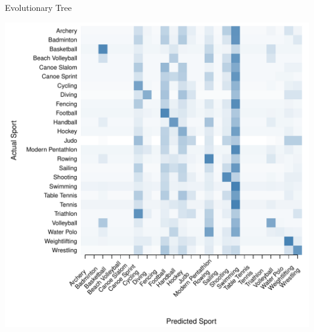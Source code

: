 \begin{center}
\begin{minipage}{0.45\textwidth}
\begin{center}
    \end{center}
  \end{minipage}



    Evolutionary Tree \\

  \begin{minipage}{0.45\textwidth}
    \begin{center}
      \includegraphics[scale=0.27]{../graphics/sportEV-trn.pdf}
    \end{center}
  \end{minipage}
  \hspace{0.05\textwidth}
  \begin{minipage}{0.45\textwidth}
    \begin{center}

\end{center}
\end{minipage}
\end{center}
